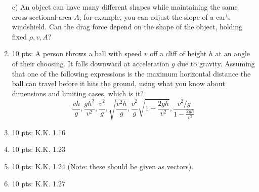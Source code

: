 \documentclass[10pt, oneside]{amsart}   	%
\begin{document}
\begin{enumerate}
c) An object can have many different shapes while maintaining the same cross-sectional area $A$; for example, you can adjust the slope of a car's windshield. Can the drag force depend on the shape of the object, holding fixed $\rho, v, A$?

\item{10 pts:} A person throws a ball with speed $v$ off a cliff of height $h$ at an angle of their choosing. It falls downward at acceleration $g$ due to gravity.
Assuming that one of the following expressions is the maximum horizontal distance the ball can travel before it hits the ground, using what you know about dimensions and limiting cases, which is it? 
\begin{equation*}
\frac{v h}{g}, \frac{g h^2}{v^2}, \frac{v^2}{g}, \sqrt{\frac{v^2 h}{g}}, \frac{v^2}{g} \sqrt{1 + \frac{2 g h}{v^2}}, \frac{v^2 / g}{1 - \frac{2 g h}{v^2}}
\end{equation*}


\vspace{5mm}

\item{10 pts:} K.K. 1.16

\item{10 pts:} K.K. 1.23

\item{10 pts:} K.K. 1.24 (Note: these should be given as vectors).

\item{10 pts:} K.K. 1.27



\end{enumerate}
\end{document}
